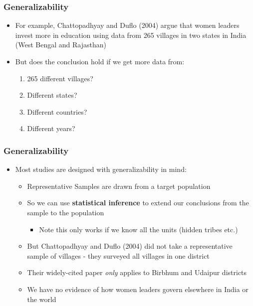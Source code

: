 \documentclass[xcolor=x11names,compress]{beamer}\usepackage[]{graphicx}\usepackage[]{color}
\renewcommand{\(}{\begin{columns}}
\renewcommand{\)}{\end{columns}}
\newcommand{\<}[1]{\begin{column}{#1}}
\renewcommand{\>}{\end{column}}
\begin{document}
\begin{frame}
\frametitle{Generalizability}
\begin{itemize}
\item For example, Chattopadhyay and Duflo (2004) argue that women leaders invest more in education using data from 265 villages in two states in India (West Bengal and Rajasthan)
\item But does the conclusion hold if we get more data from:
\begin{enumerate}
\item 265 different villages?
\item Different states?
\item Different countries?
\item Different years?
\end{enumerate}
\end{itemize}
\end{frame}

\begin{frame}
\frametitle{Generalizability}
\begin{itemize}
\item Most studies are designed with generalizability in mind:
\begin{itemize}
\item Representative Samples are drawn from a target population
\item So we can use \textbf{statistical inference} to extend our conclusions from the sample to the population
\begin{itemize}
\item Note this only works if we know all the units (hidden tribes etc.)
\end{itemize}
\item But Chattopadhyay and Duflo (2004) did not take a representative sample of villages - they surveyed all villages in one district
\item Their widely-cited paper \textit{only} applies to Birbhum and Udaipur districts
\item We have no evidence of how women leaders govern elsewhere in India or the world
\end{itemize}
\end{itemize}
\end{frame}
\end{document}
